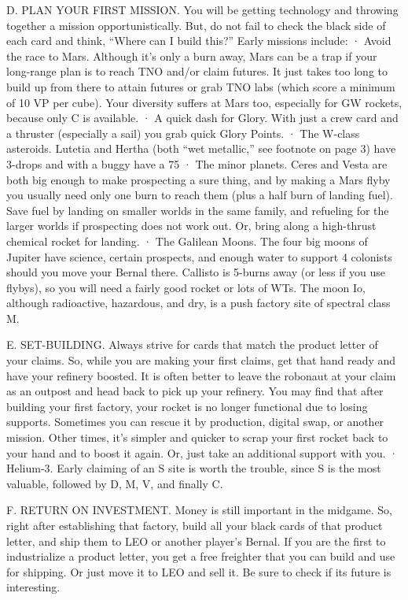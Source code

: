 \documentclass[a4paper]{book}
\begin{document}
D. PLAN YOUR FIRST MISSION. You will be getting technology and throwing together a mission opportunistically. But, do not fail to check the black side of each card and think, “Where can I build this?” Early missions include:
·       Avoid the race to Mars. Although it’s only a burn away, Mars can be a trap if your long-range plan is to reach TNO and/or claim futures. It just takes too long to build up from there to attain futures or grab TNO labs (which score a minimum of 10 VP per cube). Your diversity suffers at Mars too, especially for GW rockets, because only C is available. 
·       A quick dash for Glory. With just a crew card and a thruster (especially a sail) you grab quick Glory Points.
·       The W-class asteroids. Lutetia and Hertha (both “wet metallic,” see footnote on page 3) have 3-drops and with a buggy have a 75%
·       The minor planets. Ceres and Vesta are both big enough to make prospecting a sure thing, and by making a Mars flyby you usually need only one burn to reach them (plus a half burn of landing fuel). Save fuel by landing on smaller worlds in the same family, and refueling for the larger worlds if prospecting does not work out. Or, bring along a high-thrust chemical rocket for landing.
·       The Galilean Moons. The four big moons of Jupiter have science, certain prospects, and enough water to support 4 colonists should you move your Bernal there. Callisto is 5-burns away (or less if you use flybys), so you will need a fairly good rocket or lots of WTs. The moon Io, although radioactive, hazardous, and dry, is a push factory site of spectral class M.

E. SET-BUILDING. Always strive for cards that match the product letter of your claims. So, while you are making your first claims, get that hand ready and have your refinery boosted. It is often better to leave the robonaut at your claim as an outpost and head back to pick up your refinery. You may find that after building your first factory, your rocket is no longer functional due to losing supports. Sometimes you can rescue it by production, digital swap, or another mission. Other times, it’s simpler and quicker to scrap your first rocket back to your hand and to boost it again. Or, just take an additional support with you.
·       Helium-3. Early claiming of an S site is worth the trouble, since S is the most valuable, followed by D, M, V, and finally C.

F. RETURN ON INVESTMENT. Money is still important in the midgame. So, right after establishing that factory, build all your black cards of that product letter, and ship them to LEO or another player’s Bernal. If you are the first to industrialize a product letter, you get a free freighter that you can build and use for shipping. Or just move it to LEO and sell it. Be sure to check if its future is interesting.
\end{document}
